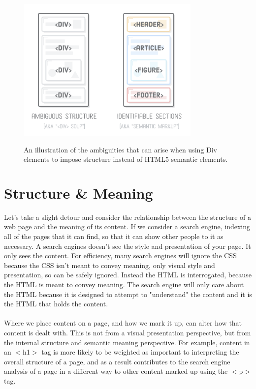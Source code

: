 \begin{figure}[H]
\centering
\includegraphics[width=0.8\textwidth]{figures/div-soup}
\label{fig:div-soup}
\caption{An illustration of the ambiguities that can arise when using Div elements to impose structure instead of HTML5 semantic elements.}
\end{figure}

\section{Structure \& Meaning}
\paragraph{} Let's take a slight detour and consider the relationship between the structure of a web page and the meaning of its content. If we consider a search engine, indexing all of the pages that it can find, so that it can show other people to it as necessary. A search engines doesn’t see the style and presentation of your page. It only sees the content. For efficiency, many search engines will ignore the CSS because the CSS isn't meant to convey meaning, only visual style and presentation, so can be safely ignored. Instead the HTML is interrogated, because the HTML is meant to convey meaning. The search engine will only care about the HTML because it is designed to attempt to "understand" the content and it is the HTML that holds the content. 

\paragraph{} Where we place content on a page, and how we mark it up, can alter how that content is dealt with. This is not from a visual presentation perspective, but from the internal structure and semantic meaning perspective. For example, content in an $<$h1$>$ tag is more likely to be weighted as important to interpreting the overall structure of a page, and as a result contributes to the search engine analysis of a page in a different way to other content marked up using the $<$p$>$ tag.

